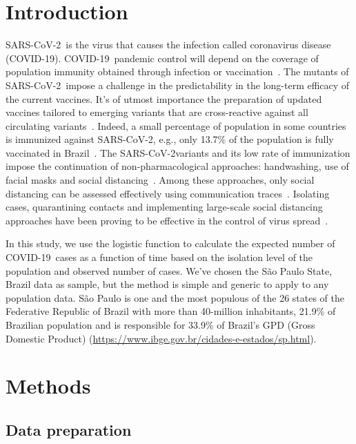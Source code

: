 \documentclass[review]{elsarticle}
\def\covid{\hbox{COVID-19}} %
\def\sarscov{\hbox{SARS-CoV-2}}
\begin{document}
\linenumbers

\section{Introduction}

\sarscov\ is the virus that causes the infection 
called coronavirus disease (\covid). 
\covid\ pandemic control will depend 
on the coverage of population immunity obtained 
through infection or vaccination~\cite{WHOa}. 
The mutants of \sarscov\ impose a challenge in 
the predictability in the long-term efficacy 
of the current vaccines. 
 It's of utmost importance the preparation of updated 
 vaccines tailored to emerging variants that are cross-reactive 
 against all circulating variants~\cite{Harvey2021}. 
Indeed, a small percentage of population in some countries 
is immunized against \sarscov, 
e.g., only 13.7\% of the population 
is fully vaccinated in Brazil~\cite{MH2021}.
The \sarscov variants and its low rate of immunization 
impose the continuation of non-pharmacological approaches: 
handwashing, use of facial masks and social distancing~\cite{WHOb}. 
Among these approaches, only social distancing 
can be assessed effectively using 
communication traces~\cite{Farrahi2014}. 
 Isolating cases, quarantining contacts and implementing
large-scale social distancing approaches have been proving to 
be effective in the control of virus spread~\cite{Aquino2020}.

In this study, we use the logistic function 
to calculate the expected number of \covid\ cases 
as a function of time
based 
on the isolation level of the population and 
observed number of cases. 
We've chosen the S\~{a}o Paulo State, Brazil data as sample, 
but the method is simple and generic 
to apply to any population data. 
S\~{a}o Paulo is one and the most populous of the 26 states 
of the Federative Republic of Brazil with 
more than 40-million inhabitants, 21.9\% 
of Brazilian population and is responsible for 33.9\% 
of Brazil's GPD (Gross Domestic Product) 
(\url{https://www.ibge.gov.br/cidades-e-estados/sp.html}).

\section{Methods}

\subsection{Data preparation}
\end{document}
